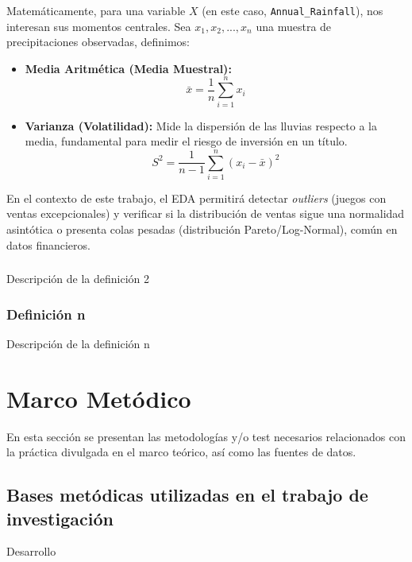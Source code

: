 \documentclass[oneside,11pt]{Latex/Classes/PhDthesisPSnPDF}
\begin{document}
Matemáticamente, para una variable \(X\) (en este caso,
\texttt{Annual\_Rainfall}), nos interesan sus momentos centrales. Sea
\(x_1, x_2, ..., x_n\) una muestra de precipitaciones observadas,
definimos:\\

\begin{itemize}
\item
  \textbf{Media Aritmética (Media Muestral):} \[
  \bar{x} = \frac{1}{n} \sum_{i=1}^{n} x_i
  \]
\item
  \textbf{Varianza (Volatilidad):} Mide la dispersión de las lluvias
  respecto a la media, fundamental para medir el riesgo de inversión en
  un título. \[S^2 = \frac{1}{n-1} \sum_{i=1}^{n} (x_i - \bar{x})^2\]
\end{itemize}

En el contexto de este trabajo, el EDA permitirá detectar
\emph{outliers} (juegos con ventas excepcionales) y verificar si la
distribución de ventas sigue una normalidad asintótica o presenta colas
pesadas (distribución Pareto/Log-Normal), común en datos financieros.

\subsection{}

Descripción de la definición 2\\

\subsection{Definición n}

Descripción de la definición n\\

\chapter{Marco Metódico}

En esta sección se presentan las metodologías y/o test necesarios
relacionados con la práctica divulgada en el marco teórico, así como las
fuentes de datos.

\section{Bases metódicas utilizadas en el trabajo de investigación}

Desarrollo\\
\end{document}

